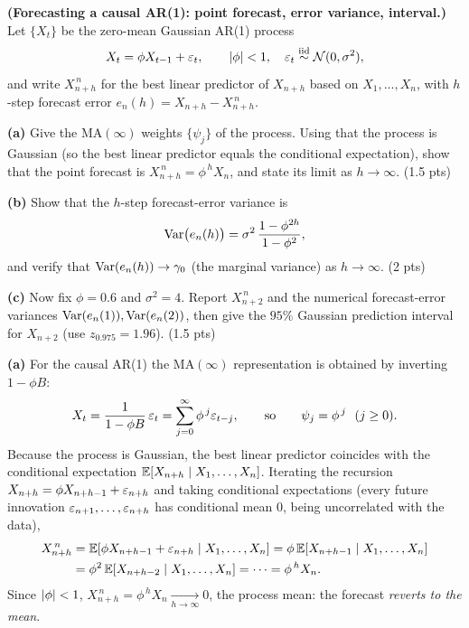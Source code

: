 \documentclass[11pt]{article}
\begin{document}

\statementstart
\textbf{(Forecasting a causal AR(1): point forecast, error variance, interval.)}
Let $\{X_t\}$ be the zero-mean Gaussian AR(1) process
\[
X_t=\phi X_{t-1}+\varepsilon_t,\qquad \left\lvert \phi \right\rvert<1,\quad \varepsilon_t\overset{\text{iid}}{\sim}\mathcal N(0,\sigma^2),
\]
and write $X^{\,n}_{n+h}$ for the best linear predictor of $X_{n+h}$ based on
$X_1,\dots,X_n$, with $h$-step forecast error $e_n(h)=X_{n+h}-X^{\,n}_{n+h}$.

\textbf{(a)} Give the $\mathrm{MA}(\infty)$ weights $\{\psi_j\}$ of the process. Using that the process is Gaussian (so the best linear predictor equals the conditional expectation), show that the point forecast is $X^{\,n}_{n+h}=\phi^{\,h}X_n$, and state its limit as $h\to\infty$. \hfill(1.5 pts)

\textbf{(b)} Show that the $h$-step forecast-error variance is
\[
\operatorname{Var}\bigl(e_n(h)\bigr)=\sigma^2\,\frac{1-\phi^{2h}}{1-\phi^2},
\]
and verify that $\operatorname{Var}(e_n(h))\to\gamma_0$ (the marginal variance) as $h\to\infty$. \hfill(2 pts)

\textbf{(c)} Now fix $\phi=0.6$ and $\sigma^2=4$. Report $X^{\,n}_{n+2}$ and the numerical forecast-error variances $\operatorname{Var}(e_n(1)),\operatorname{Var}(e_n(2))$, then give the $95\%$ Gaussian prediction interval for $X_{n+2}$ (use $z_{0.975}=1.96$). \hfill(1.5 pts)
\statementend

\textbf{(a)} For the causal AR(1) the $\mathrm{MA}(\infty)$ representation is obtained by inverting $1-\phi B$:
\[
X_t=\frac{1}{1-\phi B}\,\varepsilon_t=\sum_{j=0}^\infty\phi^{\,j}\varepsilon_{t-j},
\qquad\text{so}\qquad \psi_j=\phi^{\,j}\ \ (j\ge0).
\]
Because the process is Gaussian, the best linear predictor coincides with the conditional expectation $\mathbb{E}[X_{n+h}\mid X_1,\dots,X_n]$. Iterating the recursion $X_{n+h}=\phi X_{n+h-1}+\varepsilon_{n+h}$ and taking conditional expectations (every future innovation $\varepsilon_{n+1},\dots,\varepsilon_{n+h}$ has conditional mean $0$, being uncorrelated with the data),
\[
\begin{aligned}
X^{\,n}_{n+h}
&=\mathbb{E}[\phi X_{n+h-1}+\varepsilon_{n+h}\mid X_1,\dots,X_n]
=\phi\,\mathbb{E}[X_{n+h-1}\mid X_1,\dots,X_n]\\
&=\phi^2\,\mathbb{E}[X_{n+h-2}\mid X_1,\dots,X_n]=\cdots=\phi^{\,h}X_n .
\end{aligned}
\]
Since $\left\lvert \phi \right\rvert<1$, $X^{\,n}_{n+h}=\phi^{\,h}X_n\xrightarrow[h\to\infty]{}0$, the process mean: the forecast \emph{reverts to the mean}.
\end{document}
